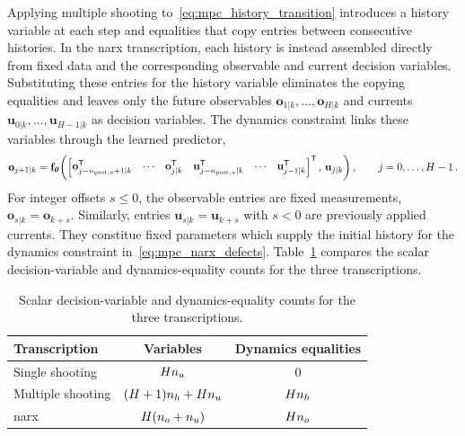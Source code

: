 Applying multiple shooting to~\eqref{eq:mpc_history_transition} introduces a history variable at each step and equalities that copy entries between consecutive histories.
In the \ac{narx} transcription, each history is instead assembled directly from fixed data and the corresponding observable and current decision variables.
Substituting these entries for the history variable eliminates the copying equalities and leaves only the future observables $\mathbf o_{1|k},\ldots,\mathbf o_{H|k}$ and currents $\mathbf u_{0|k},\ldots,\mathbf u_{H-1|k}$ as decision variables.
The dynamics constraint links these variables through the learned predictor,
%
\begin{equation}
    \mathbf o_{j+1|k}
    =\mathbf f_{\boldsymbol\theta}\!\left(
      \begin{bmatrix}
        \mathbf o_{j-n_{\mathrm{past},o}+1|k}^{\mathsf T} & \cdots & \mathbf o_{j|k}^{\mathsf T} &
        \mathbf u_{j-n_{\mathrm{past},u}|k}^{\mathsf T} & \cdots & \mathbf u_{j-1|k}^{\mathsf T}
      \end{bmatrix}^{\mathsf T},\,
      \mathbf u_{j|k}\right),
    \qquad j=0,\ldots,H-1\,.
    \label{eq:mpc_narx_defects}
\end{equation}
%
For integer offsets $s\leq0$, the observable entries are fixed measurements, $\mathbf o_{s|k}=\mathbf o_{k+s}$.
Similarly, entries $\mathbf u_{s|k}=\mathbf u_{k+s}$ with $s<0$ are previously applied currents.
They constitue fixed parameters which supply the initial history for the dynamics constraint in~\eqref{eq:mpc_narx_defects}.
Table~\ref{tab:mpc_transcription_counts} compares the scalar decision-variable and dynamics-equality counts for the three transcriptions.

\begin{table}
    \centering
    \caption{Scalar decision-variable and dynamics-equality counts for the three transcriptions.}\label{tab:mpc_transcription_counts}
    \begin{tabular}{lcc}
        \toprule
        Transcription & Variables & Dynamics equalities \\
        \midrule
        Single shooting & $Hn_{u}$ & $0$ \\
        Multiple shooting & $(H+1)n_{h}+Hn_{u}$ & $Hn_{h}$ \\
        \ac{narx} & $H(n_{o}+n_{u})$ & $Hn_{o}$ \\
        \bottomrule
    \end{tabular}
\end{table}

